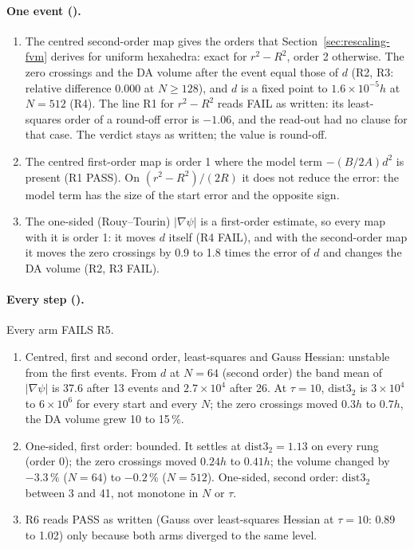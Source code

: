 \paragraph{One event (\Meas).}
\begin{enumerate}
\item The centred second-order map gives the orders that Section~\ref{sec:rescaling-fvm} derives
for uniform hexahedra: exact for $r^2-R^2$, order 2 otherwise. The zero crossings and the DA
volume after the event equal those of $d$ (R2, R3: relative difference 0.000 at $N\ge128$), and
$d$ is a fixed point to $1.6\times10^{-5}h$ at $N=512$ (R4). The line R1 for $r^2-R^2$ reads
FAIL as written: its least-squares order of a round-off error is $-1.06$, and the read-out had no
clause for that case. The verdict stays as written; the value is round-off.
\item The centred first-order map is order 1 where the model term $-(B/2A)d^2$ is present (R1
PASS). On $(r^2-R^2)/(2R)$ it does not reduce the error: the model term has the size of the start
error and the opposite sign.
\item The one-sided (Rouy--Tourin) $|\nabla\psi|$ is a first-order estimate, so every map with
it is order 1: it moves $d$ itself (R4 FAIL), and with the second-order map it moves the zero
crossings by 0.9 to 1.8 times the error of $d$ and changes the DA volume (R2, R3 FAIL).
\end{enumerate}

\paragraph{Every step (\Meas).} Every arm FAILS R5.
\begin{enumerate}
\item Centred, first and second order, least-squares and Gauss Hessian: unstable from the first
events. From $d$ at $N=64$ (second order) the band mean of $|\nabla\psi|$ is 37.6 after 13
events and $2.7\times10^4$ after 26. At $\tau=10$, $\mathrm{dist3}_2$ is $3\times10^4$ to
$6\times10^6$ for every start and every $N$; the zero crossings moved $0.3h$ to $0.7h$, the DA
volume grew 10 to 15\,\%.
\item One-sided, first order: bounded. It settles at $\mathrm{dist3}_2=1.13$ on every rung (order
0); the zero crossings moved $0.24h$ to $0.41h$; the volume changed by $-3.3\,\%$ ($N=64$) to
$-0.2\,\%$ ($N=512$). One-sided, second order: $\mathrm{dist3}_2$ between 3 and 41, not
monotone in $N$ or $\tau$.
\item R6 reads PASS as written (Gauss over least-squares Hessian at $\tau=10$: 0.89 to 1.02) only
because both arms diverged to the same level.
\end{enumerate}

